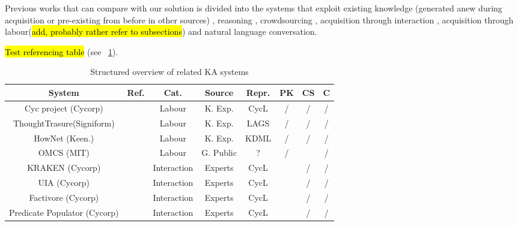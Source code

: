 Previous works that can compare with our solution is divided into the systems that exploit existing knowledge (generated anew during acquisition or pre-existing from before in other sources) \parencite{Singh2002a,Witbrock2003,Forbus2007,Kvo2010,Sharma2010,Mitchel2015}, reasoning \parencite{Witbrock2003,Speer2007,Speer2008,Kuo2010}, crowdsourcing \parencite{Singh2002,Speer2009, Kuo2010, Pedro2012a, Pedro2013}, acquisition through interaction \parencite{Speer2009,Pedro2012,Pedro2013}, acquisition through labour(\hl{add, probably rather refer to subsections}) \parencite{} and natural language conversation\parencite{Pedro2012, Speer2007,Speer2009, Witbrock2003,Kuo2010}.

\hl{Test referencing table} (see \tablename~\ref{tab:related}).

\begin{table}[htb]
	\caption{Structured overview of related KA systems}
	\label{tab:related}
	\centering
	\begin{tabular}{cccccccc}
		\hline
		System & Ref. & Cat. & Source & Repr. & PK &  CS & C \\
		\hline
		Cyc project (Cycorp) & \parencite{Lenat1995} & Labour & K. Exp. & CycL & / & / & / \\
		ThoughtTrasure(Signiform) & \parencite{Mueller2003} & Labour & K. Exp. & LAGS & / & / & / \\
		HowNet (Keen.) & \parencite{Dong2010} & Labour & K. Exp. & KDML & / & / & / \\
		OMCS (MIT) & \parencite{Singh2002a} & Labour & G. Public & ? & / & \checkmark & / \\
		KRAKEN (Cycorp) & \parencite{Panton2002a} & Interaction & Experts & CycL & \checkmark & / & / \\
		UIA (Cycorp) & \parencite{Witbrock2003UIA} & Interaction & Experts & CycL & \checkmark & / & / \\
		Factivore (Cycorp) & \parencite{Witbrock2005} & Interaction & Experts & CycL & \checkmark & / & / \\
		Predicate Populator (Cycorp) & \parencite{Witbrock2005} & Interaction & Experts & CycL & \checkmark & / & / \\
		\hline
	\end{tabular}
\end{table}

